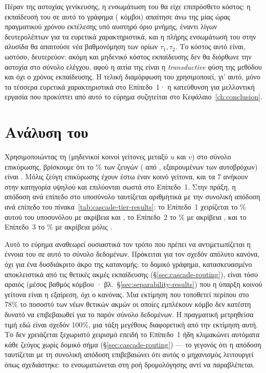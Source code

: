 Πέραν της αστοχίας γενίκευσης, η ενσωμάτωση του  θα είχε επιπρόσθετο
κόστος: η εκπαίδευσή του σε αυτό το γράφημα (\GraphNodes{} κόμβοι) απαίτησε άνω της μίας
ώρας πραγματικού χρόνου εκτέλεσης υπό αυστηρό όριο μνήμης, έναντι λίγων
δευτερολέπτων για τα ευρετικά χαρακτηριστικά, και η πλήρης ενσωμάτωσή του στην
αλυσίδα θα απαιτούσε νέα βαθμονόμηση των ορίων $\tau_1, \tau_2$.
Το κόστος αυτό
είναι, ωστόσο, δευτερεύον: ακόμη και μηδενικό κόστος εκπαίδευσης δεν θα διόρθωνε
την αστοχία στο σύνολο ελέγχου, αφού η αιτία της είναι η \textit{transductive}
φύση της μεθόδου και όχι ο χρόνος εκπαίδευσης.
Η τελική διαμόρφωση του
 χρησιμοποιεί, γι' αυτό, μόνο τα τέσσερα ευρετικά χαρακτηριστικά στο
Επίπεδο~1· η κατεύθυνση για μελλοντική εργασία που προκύπτει από αυτό το εύρημα
συζητείται στο Κεφάλαιο~\ref{ch:conclusion}.


\section{Ανάλυση του }
\label{sec:cold-start-results}

Χρησιμοποιώντας τη \texttt{} (μηδενικοί κοινοί γείτονες μεταξύ
$u$ και $v$) στο σύνολο επικύρωσης, βρίσκουμε ότι το \ColdStartPct\% των ζευγών
(\ColdStartCount{} από \ValSplitSize{}, εξαιρουμένων των αυτοβρόχων) είναι .
Μόλις \ColdStartNonCount{} ζεύγη επικύρωσης έχουν έστω έναν κοινό γείτονα, και τα 7 ανήκουν στην
κατηγορία υψηλού  και επιλύονται σωστά στο Επίπεδο~1.
Στην πράξη, η
απόδοση ανά επίπεδο στο υποσύνολο  ταυτίζεται αριθμητικά με
την συνολική απόδοση ανά επίπεδο του πίνακα~\ref{tab:cascade-tier-results}: το
Επίπεδο~1 χειρίζεται το \TierOnePct\% αυτού του υποσυνόλου με ακρίβεια \TierOneAcc{} και
 \TierOneFone{}, το Επίπεδο~2 το \TierTwoPct\% με ακρίβεια \TierTwoAcc{}, και το
Επίπεδο~3 το \TierThreePct\% με ακρίβεια μόλις \TierThreeAcc{}.

Αυτό το εύρημα αναθεωρεί ουσιαστικά τον τρόπο που πρέπει να αντιμετωπίζεται η
έννοια του  σε αυτό το σύνολο δεδομένων.
Πρόκειται για τον σχεδόν
απόλυτο κανόνα, όχι για ένα δυσδιάκριτο άκρο της κατανομής: το δομικό
γράφημα, κατασκευασμένο αποκλειστικά από τις θετικές ακμές εκπαίδευσης
(\S\ref{sec:cascade-routing}), είναι τόσο αραιός (μέσος βαθμός κόμβου \GraphMeanDegree· βλ.\
\S\ref{sec:separability-results}) που η ύπαρξη κοινού γείτονα είναι η εξαίρεση, όχι
ο κανόνας.
Μια εκτίμηση που τοποθετεί περίπου στο 78\% το ποσοστό των νέων θετικών
ακμών οι οποίες εμπλέκουν κόμβο \en{cold-start} δεν κατέστη δυνατό να επιβεβαιωθεί
για το παρόν σύνολο δεδομένων.
Η πραγματική μετρηθείσα τιμή εδώ είναι σχεδόν 100\%,
μια τάξη μεγέθους διαφορετική από την εκτίμηση αυτή.
Το  δεν
χρειάζεται ξεχωριστό χειρισμό  επειδή το Επίπεδο~1 ήδη
κλιμακώνει αυτόματα κάθε ζεύγος χωρίς δομικό σήμα (\S\ref{sec:cascade-routing}) ---
το γεγονός ότι η απόδοση  ταυτίζεται με τη συνολική απόδοση
επιβεβαιώνει ότι αυτός ο μηχανισμός λειτουργεί όπως σχεδιάστηκε: το \en{cold-start}
ενσωματώνεται στη ροή δρομολόγησης αντί να παραβλέπεται.


